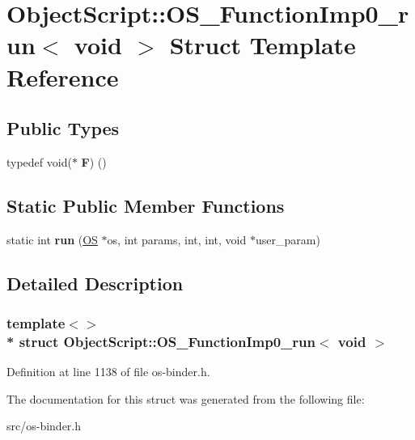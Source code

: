 \hypertarget{struct_object_script_1_1_o_s___function_imp0__run_3_01void_01_4}{}\section{Object\+Script\+:\+:O\+S\+\_\+\+Function\+Imp0\+\_\+run$<$ void $>$ Struct Template Reference}
\label{struct_object_script_1_1_o_s___function_imp0__run_3_01void_01_4}
\subsection*{Public Types}
\begin{DoxyCompactItemize}
\item 
typedef void($\ast$ {\bfseries F}) ()\hypertarget{struct_object_script_1_1_o_s___function_imp0__run_3_01void_01_4_a387f6504c1ca70b6df2d974506873556}{}\label{struct_object_script_1_1_o_s___function_imp0__run_3_01void_01_4_a387f6504c1ca70b6df2d974506873556}

\end{DoxyCompactItemize}
\subsection*{Static Public Member Functions}
\begin{DoxyCompactItemize}
\item 
static int {\bfseries run} (\hyperlink{class_object_script_1_1_o_s}{OS} $\ast$os, int params, int, int, void $\ast$user\+\_\+param)\hypertarget{struct_object_script_1_1_o_s___function_imp0__run_3_01void_01_4_a5cf3b9b93f663810f154a63896a91eca}{}\label{struct_object_script_1_1_o_s___function_imp0__run_3_01void_01_4_a5cf3b9b93f663810f154a63896a91eca}

\end{DoxyCompactItemize}


\subsection{Detailed Description}
\subsubsection*{template$<$$>$\\*
struct Object\+Script\+::\+O\+S\+\_\+\+Function\+Imp0\+\_\+run$<$ void $>$}



Definition at line 1138 of file os-\/binder.\+h.



The documentation for this struct was generated from the following file\+:\begin{DoxyCompactItemize}
\item 
src/os-\/binder.\+h\end{DoxyCompactItemize}

